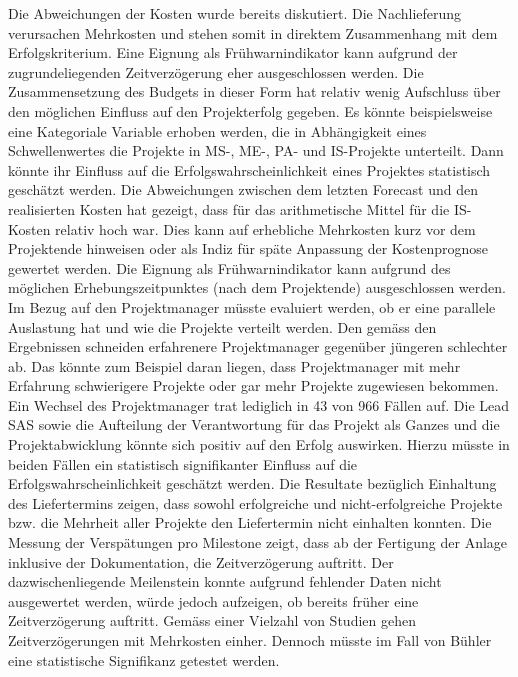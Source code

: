 \newline Die Abweichungen der Kosten wurde bereits diskutiert. Die Nachlieferung verursachen Mehrkosten und stehen somit in direktem Zusammenhang mit dem Erfolgskriterium. Eine Eignung als Frühwarnindikator kann aufgrund der zugrundeliegenden Zeitverzögerung eher ausgeschlossen werden. Die Zusammensetzung des Budgets in dieser Form hat relativ wenig Aufschluss über den möglichen Einfluss auf den Projekterfolg gegeben. Es könnte beispielsweise eine Kategoriale Variable erhoben werden, die in Abhängigkeit eines Schwellenwertes die Projekte in MS-, ME-, PA- und IS-Projekte unterteilt. Dann könnte ihr Einfluss auf die Erfolgswahrscheinlichkeit eines Projektes statistisch geschätzt werden. Die Abweichungen zwischen dem letzten Forecast und den realisierten Kosten hat gezeigt, dass für das arithmetische Mittel für die IS-Kosten relativ hoch war. Dies kann auf erhebliche Mehrkosten kurz vor dem Projektende hinweisen oder als Indiz für späte Anpassung der Kostenprognose gewertet werden. Die Eignung als Frühwarnindikator kann aufgrund des möglichen Erhebungszeitpunktes (nach dem Projektende) ausgeschlossen werden.
\newline
Im Bezug auf den Projektmanager müsste evaluiert werden, ob er eine parallele Auslastung hat und wie die Projekte verteilt werden. Den gemäss den Ergebnissen schneiden erfahrenere Projektmanager gegenüber jüngeren schlechter ab. Das könnte zum Beispiel daran liegen, dass Projektmanager mit mehr Erfahrung schwierigere Projekte oder gar mehr Projekte zugewiesen bekommen. Ein Wechsel des Projektmanager trat lediglich in 43 von 966 Fällen auf. Die Lead SAS sowie die Aufteilung der Verantwortung für das Projekt als Ganzes und die Projektabwicklung könnte sich positiv auf den Erfolg auswirken. Hierzu müsste in beiden Fällen ein statistisch signifikanter Einfluss auf die Erfolgswahrscheinlichkeit geschätzt werden. 
\newline
Die Resultate bezüglich Einhaltung des Liefertermins zeigen, dass sowohl erfolgreiche und nicht-erfolgreiche Projekte bzw. die Mehrheit aller Projekte den Liefertermin nicht einhalten konnten. Die Messung der Verspätungen pro Milestone zeigt, dass ab der Fertigung der Anlage inklusive der Dokumentation, die Zeitverzögerung auftritt. Der dazwischenliegende Meilenstein konnte aufgrund fehlender Daten nicht ausgewertet werden, würde jedoch aufzeigen, ob bereits früher eine Zeitverzögerung auftritt. Gemäss einer Vielzahl von Studien gehen Zeitverzögerungen mit Mehrkosten einher. Dennoch müsste im Fall von Bühler eine statistische Signifikanz getestet werden.
